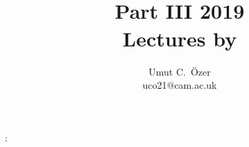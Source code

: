\usepackage{amsthm}
  {\topsep}%
  {\topsep}%
  {\normalfont}%
  {}%
  {\bfseries}%
  {:}%
  { }%
  {}%
\theoremstyle{StandardStyle}

\newtheorem{theorem}{Theorem}
\newtheorem{lemma}[theorem]{Lemma}
\newtheorem*{claim}{Claim}
\newtheorem*{proposition}{Proposition}
\newtheorem*{corollary}{Corollary}

\newtheorem{definition}{Definition}
\newtheorem*{notation}{Notation}

\newtheorem*{example}{Example}
\newtheorem{exercise}{Exercise}[section]

\usepackage{framed} %
\newtheorem*{remark}{Remark}

\newcommand{\bdd}[2][]{\mathop{\mathrm{d\hspace*{-0.2em}\bar{}\hspace*{0.2em}}^{#1}\hspace*{-0.05em}{#2}}}

\newcommand{\bdelta}{\delta\hspace*{-0.2em}\bar{}\hspace*{0.2em}}

\newcommand*\pdd[1]{\mathop{\mathcal{D} #1}}

\author{Umut C.~\"Ozer\\uco21@cam.ac.uk}
\title{{\Huge \coursetitle{}}\\
Part III \term{} 2019\\
Lectures by \lecturer{}}
